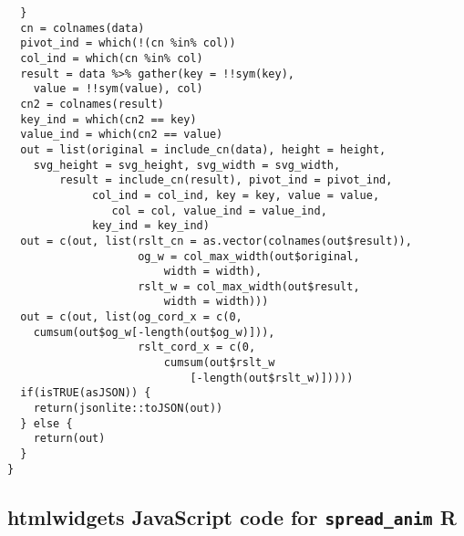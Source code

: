 \begin{lstlisting}
  }
  cn = colnames(data)
  pivot_ind = which(!(cn %in% col))
  col_ind = which(cn %in% col)
  result = data %>% gather(key = !!sym(key), 
    value = !!sym(value), col)
  cn2 = colnames(result)
  key_ind = which(cn2 == key)
  value_ind = which(cn2 == value)
  out = list(original = include_cn(data), height = height, 
    svg_height = svg_height, svg_width = svg_width,
        result = include_cn(result), pivot_ind = pivot_ind,
             col_ind = col_ind, key = key, value = value, 
                col = col, value_ind = value_ind,
             key_ind = key_ind)
  out = c(out, list(rslt_cn = as.vector(colnames(out$result)),
                    og_w = col_max_width(out$original, 
                        width = width),
                    rslt_w = col_max_width(out$result, 
                        width = width)))
  out = c(out, list(og_cord_x = c(0, 
    cumsum(out$og_w[-length(out$og_w)])),
                    rslt_cord_x = c(0, 
                        cumsum(out$rslt_w
                            [-length(out$rslt_w)]))))
  if(isTRUE(asJSON)) {
    return(jsonlite::toJSON(out))
  } else {
    return(out)
  }
}
\end{lstlisting}

\subsection{\textbf{htmlwidgets} \textsf{JavaScript} code for \texttt{spread\_anim} \textbf{R}}

